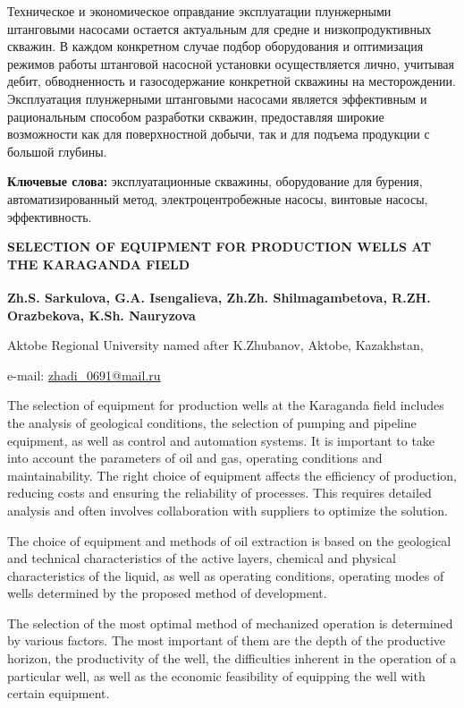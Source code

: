 Техническое и экономическое оправдание эксплуатации плунжерными
штанговыми насосами остается актуальным для средне и низкопродуктивных
скважин. В каждом конкретном случае подбор оборудования и оптимизация
режимов работы штанговой насосной установки осуществляется лично,
учитывая дебит, обводненность и газосодержание конкретной скважины на
месторождении. Эксплуатация плунжерными штанговыми насосами является
эффективным и рациональным способом разработки скважин, предоставляя
широкие возможности как для поверхностной добычи, так и для подъема
продукции с большой глубины.

{\bfseries Ключевые слова:} эксплуатационные скважины, оборудование для
бурения, автоматизированный метод, электроцентробежные насосы, винтовые
насосы, эффективность.

\begin{articleheader}
{\bfseries SELECTION OF EQUIPMENT FOR PRODUCTION WELLS AT THE KARAGANDA FIELD}

{\bfseries
Zh.S. Sarkulova\textsuperscript{\envelope },
G.A. Isengalieva,
Zh.Zh. Shilmagambetova,
R.ZH. Orazbekova,
K.Sh. Nauryzova
}
\end{articleheader}

\begin{affiliation}
Aktobe Regional University named after K.Zhubanov, Aktobe, Kazakhstan,

e-mail: \href{mailto:zhadi\_0691@mail.ru}{zhadi\_0691@mail.ru}
\end{affiliation}

The selection of equipment for production wells at the Karaganda field
includes the analysis of geological conditions, the selection of pumping
and pipeline equipment, as well as control and automation systems. It is
important to take into account the parameters of oil and gas, operating
conditions and maintainability. The right choice of equipment affects
the efficiency of production, reducing costs and ensuring the
reliability of processes. This requires detailed analysis and often
involves collaboration with suppliers to optimize the solution.

The choice of equipment and methods of oil extraction is based on the
geological and technical character\-istics of the active layers, chemical
and physical characteristics of the liquid, as well as operating
conditions, operating modes of wells determined by the proposed method
of development.

The selection of the most optimal method of mechanized operation is
determined by various factors. The most important of them are the depth
of the productive horizon, the productivity of the well, the
difficulties inherent in the operation of a particular well, as well as
the economic feasibility of equipping the well with certain equipment.


